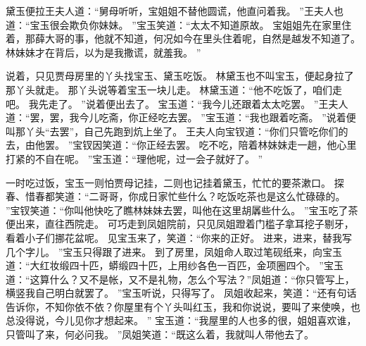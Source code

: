 黛玉便拉王夫人道：“舅母听听，宝姐姐不替他圆谎，他直问着我。
”王夫人也道：“宝玉很会欺负你妹妹。
”宝玉笑道：“太太不知道原故。
宝姐姐先在家里住着，那薛大哥的事，他就不知道，何况如今在里头住着呢，自然是越发不知道了。
林妹妹才在背后，以为是我撒谎，就羞我。
”\par
说着，只见贾母房里的丫头找宝玉、黛玉吃饭。
林黛玉也不叫宝玉，便起身拉了那丫头就走。
那丫头说等着宝玉一块儿走。
林黛玉道：“他不吃饭了，咱们走吧。
我先走了。
”说着便出去了。
宝玉道：“我今儿还跟着太太吃罢。
”王夫人道：“罢，罢，我今儿吃斋，你正经吃去罢。
”宝玉道：“我也跟着吃斋。
”说着便叫那丫头“去罢”，自己先跑到炕上坐了。
王夫人向宝钗道：“你们只管吃你们的去，由他罢。
”宝钗因笑道：“你正经去罢。
吃不吃，陪着林妹妹走一趟，他心里打紧的不自在呢。
”宝玉道：“理他呢，过一会子就好了。
”\par
一时吃过饭，宝玉一则怕贾母记挂，二则也记挂着黛玉，忙忙的要茶漱口。
探春、惜春都笑道：“二哥哥，你成日家忙些什么？吃饭吃茶也是这么忙碌碌的。
”宝钗笑道：“你叫他快吃了瞧林妹妹去罢，叫他在这里胡羼些什么。
”宝玉吃了茶便出来，直往西院走。
可巧走到凤姐院前，只见凤姐蹬着门槛子拿耳挖子剔牙，看着小子们挪花盆呢。
见宝玉来了，笑道：“你来的正好。
进来，进来，替我写几个字儿。
”宝玉只得跟了进来。
到了房里，凤姐命人取过笔砚纸来，向宝玉道：“大红妆缎四十匹，蟒缎四十匹，上用纱各色一百匹，金项圈四个。
”宝玉道：“这算什么？又不是帐，又不是礼物，怎么个写法？”凤姐道：“你只管写上，横竖我自己明白就罢了。
”宝玉听说，只得写了。
凤姐收起来，笑道：“还有句话告诉你，不知你依不依？你屋里有个丫头叫红玉，我和你说说，要叫了来使唤，也总没得说，今儿见你才想起来。
” 
宝玉道：“我屋里的人也多的很，姐姐喜欢谁，只管叫了来，何必问我。
”凤姐笑道：“既这么着，我就叫人带他去了。
